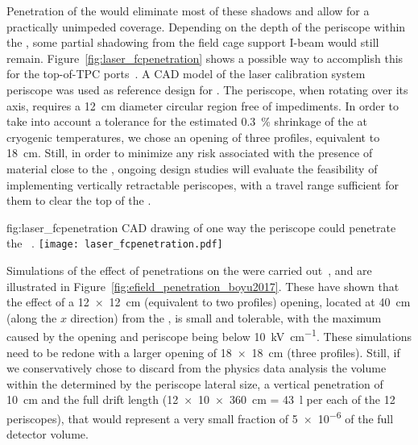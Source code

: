 Penetration of the  would eliminate most of these shadows and allow for a practically unimpeded coverage. Depending on the depth of the periscope within the , some partial shadowing from the field cage support I-beam would still remain.
Figure~\ref{fig:laser_fcpenetration} shows a possible way to accomplish this for the top-of-TPC ports~\cite{bib:yu2019a}. A CAD model of the  laser calibration system periscope was used as 
reference design for . The  periscope, when rotating over its axis, requires a \SI{12}{\cm} diameter circular region free of impediments. In order to take into account a tolerance for the estimated \SI{0.3}{\%} shrinkage of the  at cryogenic temperatures, we chose an opening of three profiles, equivalent to \SI{18}{\cm}. 
Still, in order to minimize any risk associated with the presence of material close to the , ongoing design studies will evaluate the feasibility of implementing vertically retractable periscopes, with a travel range sufficient for them to clear the top of the . 

\begin{dunefigure}{fig:laser_fcpenetration}
{CAD drawing of one way the periscope could penetrate the ~\cite{bib:yu2019a}.}
\texttt{[image: laser\_fcpenetration.pdf]}
\end{dunefigure}

Simulations of the effect of  penetrations on the \efield were carried out~\cite{bib:yu2017b}, and are illustrated in Figure~\ref{fig:efield_penetration_boyu2017}. These have shown that the effect of a %
\SI{12x12}{\cm}  (equivalent to two profiles) opening, located at \SI{40}{\cm} (along the $x$ direction) from the , is small and tolerable, with the maximum \efield caused by the opening and periscope being below \SI{10}{\kilo\volt\per\cm}. 
These simulations need to be redone with a larger opening of \SI{18x18}{\cm}  (three profiles).
Still, if we conservatively chose to discard from the physics data analysis the volume within the  determined by the periscope lateral size, a vertical penetration of \SI{10}{\cm} and the full drift length (\SI{12x10x360}{\cm} = \SI{43}{\litre} per each of the \num{12} periscopes), that would represent a very small fraction of \num{5e-6} of the full detector volume.

